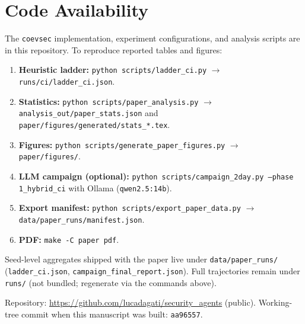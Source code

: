 \section*{Code Availability}
\label{sec:code}

The \texttt{coevsec} implementation, experiment configurations, and analysis
scripts are in this repository. To reproduce reported tables and figures:

\begin{enumerate}
\item \textbf{Heuristic ladder:}
  \texttt{python scripts/ladder\_ci.py} $\rightarrow$
  \texttt{runs/ci/ladder\_ci.json}.
\item \textbf{Statistics:}
  \texttt{python scripts/paper\_analysis.py} $\rightarrow$
  \texttt{analysis\_out/paper\_stats.json} and
  \texttt{paper/figures/generated/stats\_*.tex}.
\item \textbf{Figures:}
  \texttt{python scripts/generate\_paper\_figures.py} $\rightarrow$
  \texttt{paper/figures/}.
\item \textbf{LLM campaign (optional):}
  \texttt{python scripts/campaign\_2day.py --phase 1\_hybrid\_ci} with Ollama
  (\texttt{qwen2.5:14b}).
\item \textbf{Export manifest:}
  \texttt{python scripts/export\_paper\_data.py} $\rightarrow$
  \texttt{data/paper\_runs/manifest.json}.
\item \textbf{PDF:} \texttt{make -C paper pdf}.
\end{enumerate}

Seed-level aggregates shipped with the paper live under
\texttt{data/paper\_runs/} (\texttt{ladder\_ci.json},
\texttt{campaign\_final\_report.json}). Full trajectories remain under
\texttt{runs/} (not bundled; regenerate via the commands above).

Repository: \url{https://github.com/lucadagati/security_agents} (public).
Working-tree commit when this manuscript was built: \texttt{aa96557}.
